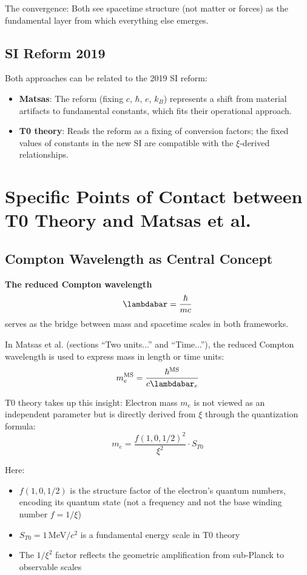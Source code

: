	The convergence: Both see spacetime structure (not matter or forces) as the fundamental layer from which everything else emerges.
	
	\subsection{SI Reform 2019}
	
	Both approaches can be related to the 2019 SI reform:
	
	\begin{itemize}
		\item \textbf{Matsas}: The reform (fixing $c$, $\hbar$, $e$, $k_B$) represents a shift from material artifacts to fundamental constants, which fits their operational approach.
		
		\item \textbf{T0 theory}: Reads the reform as a fixing of conversion factors; the fixed values of constants in the new SI are compatible with the $\xi$-derived relationships.
	\end{itemize}
	
	\section{Specific Points of Contact between T0 Theory and Matsas et al.}
	
	\subsection{Compton Wavelength as Central Concept}
	
	\begin{keyresult}
		\textbf{The reduced Compton wavelength}
		\[
		\lambdabar = \frac{\hbar}{m c}
		\]
		serves as the bridge between mass and spacetime scales in both frameworks.
	\end{keyresult}
	
	In Matsas et al. (sections ``Two units...'' and ``Time...''), the reduced Compton wavelength is used to express mass in length or time units:
	\[
	m_e^{\text{MS}} = \frac{\hbar^{\text{MS}}}{c \lambdabar_e}
	\]
	
	T0 theory takes up this insight: Electron mass $m_e$ is not viewed as an independent parameter but is directly derived from $\xi$ through the quantization formula:
	\[
	m_e = \frac{f(1,0,1/2)^2}{\xi^2} \cdot S_{T0}
	\]
	
	Here:
	\begin{itemize}
		\item $f(1,0,1/2)$ is the structure factor of the electron's quantum numbers, encoding its quantum state (not a frequency and not the base winding number $f = 1/\xi$)
		\item $S_{T0} = 1\,\text{MeV}/c^2$ is a fundamental energy scale in T0 theory
		\item The $1/\xi^2$ factor reflects the geometric amplification from sub-Planck to observable scales
	\end{itemize}

